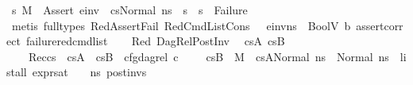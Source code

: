 \begin{isabellebody}
\ {\isacartoucheopen}{\isasymAnd}s{}{\isacharprime}{\kern0pt}{\isachardot}{\kern0pt}\ M{\isacharcomma}{\kern0pt}{\isasymLambda}{\isacharcomma}{\kern0pt}{\isasymGamma}{\isacharcomma}{\kern0pt}{\isasymOmega}\ {\isasymturnstile}\ {\isasymlangle}Assert\ e{\isacharunderscore}{\kern0pt}inv\ {\isacharhash}{\kern0pt}\ cs{}{\isacharcomma}{\kern0pt}Normal\ ns{\isasymrangle}\ {\isacharbrackleft}{\kern0pt}{\isasymrightarrow}{\isacharbrackright}{\kern0pt}\ s{}{\isacharprime}{\kern0pt}\ {\isasymLongrightarrow}\ s{}{\isacharprime}{\kern0pt}\ {\isasymnoteq}\ Failure{\isacartoucheclose}\isanewline
\ \ \ \ \isamarkupfalse%
\ {\isacharparenleft}{\kern0pt}metis\ {\isacharparenleft}{\kern0pt}full{\isacharunderscore}{\kern0pt}types{\isacharparenright}{\kern0pt}\ RedAssertFail\ RedCmdListCons\ {\isacartoucheopen}{\isasymLambda}{\isacharcomma}{\kern0pt}{\isasymGamma}{\isacharcomma}{\kern0pt}{\isasymOmega}\ {\isasymturnstile}\ {\isasymlangle}e{\isacharunderscore}{\kern0pt}inv{\isacharcomma}{\kern0pt}ns{\isasymrangle}\ {\isasymDown}\ BoolV\ b{\isacartoucheclose}\ assert{\isacharunderscore}{\kern0pt}correct\ failure{\isacharunderscore}{\kern0pt}red{\isacharunderscore}{\kern0pt}cmd{\isacharunderscore}{\kern0pt}list{\isacharparenright}{\kern0pt}\isanewline
\ \ \isamarkupfalse%
\ Red{}\ DagRel{\isacharunderscore}{\kern0pt}PostInv\ \isamarkupfalse%
\ cs{}A\ cs{}B\ \isanewline
\ \ \ \ Rec{\isacharcolon}{\kern0pt}{\isachardoublequoteopen}cs{}\ {\isacharequal}{\kern0pt}\ cs{}A\ {\isacharat}{\kern0pt}\ cs{}B\ {\isasymand}\ cfg{\isacharunderscore}{\kern0pt}dag{\isacharunderscore}{\kern0pt}rel\ c\ {\isacharbrackleft}{\kern0pt}{\isacharbrackright}{\kern0pt}\ {\isacharbrackleft}{\kern0pt}{\isacharbrackright}{\kern0pt}\ {\isacharbrackleft}{\kern0pt}{\isacharbrackright}{\kern0pt}\ {\isacharbrackleft}{\kern0pt}{\isacharbrackright}{\kern0pt}\ cs{}B\ {\isasymand}\ {\isacharparenleft}{\kern0pt}M{\isacharcomma}{\kern0pt}{\isasymLambda}{\isacharcomma}{\kern0pt}{\isasymGamma}{\isacharcomma}{\kern0pt}{\isasymOmega}\ {\isasymturnstile}\ {\isasymlangle}cs{}A{\isacharcomma}{\kern0pt}Normal\ ns{\isasymrangle}\ {\isacharbrackleft}{\kern0pt}{\isasymrightarrow}{\isacharbrackright}{\kern0pt}\ Normal\ ns{\isacharparenright}{\kern0pt}\ {\isasymand}\ list{\isacharunderscore}{\kern0pt}all\ {\isacharparenleft}{\kern0pt}expr{\isacharunderscore}{\kern0pt}sat\ {\isasymLambda}\ {\isasymGamma}\ {\isasymOmega}\ ns{\isacharparenright}{\kern0pt}\ post{\isacharunderscore}{\kern0pt}invs{\isachardoublequoteclose}\isanewline

\end{isabellebody}

